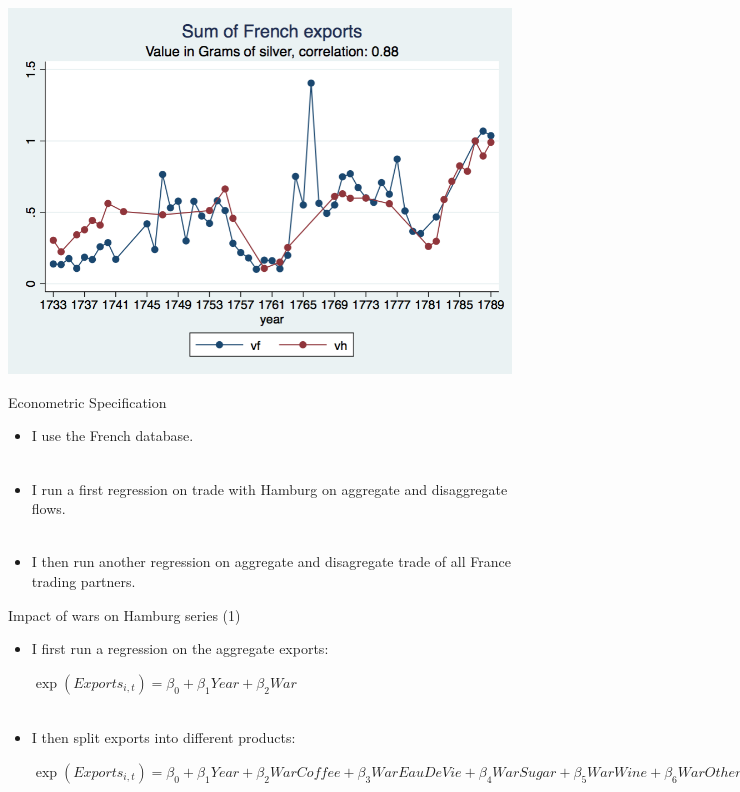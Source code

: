 \documentclass[11pt]{beamer}
\begin{document}
\begin{frame}
\begin{center}
\includegraphics[scale=.3]{long_evolution.png}
\end{center}

\end{frame}

\begin{frame}{Econometric Specification}
\begin{itemize}
\item{I use the French database.}\\~\\
\item{I run a first regression on trade with Hamburg on aggregate and disaggregate flows.}\\~\\
\item{I then run another regression on aggregate and disagregate trade of all France trading partners.}\\
\end{itemize}


\end{frame}



\begin{frame}{Impact of wars on Hamburg series (1)}
\begin{itemize}
\item{I first run a regression on the aggregate exports:
\begin{center}
$\exp(Exports_{i,t})=\beta_0+\beta_1Year+\beta_2War$\\~\\
\end{center} }
\item{I then split exports into  different products:
\begin{center}
$\exp(Exports_{i,t})=\beta_0+\beta_1Year+\beta_2WarCoffee + \beta_3WarEauDeVie+\beta_4WarSugar +\beta_5WarWine +\beta_6WarOther$
\end{center}}
\end{itemize}
\end{frame}
\end{document}
